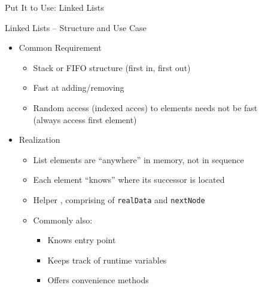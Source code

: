 \begin{frame}[fragile]{Put It to Use: Linked Lists}
\begin{tcolorbox}[title=Visualization: Inserting into an Array]
\end{tcolorbox}
%
\end{frame}


\begin{frame}[fragile]{Linked Lists -- Structure and Use Case}
%
\begin{itemize}
\item Common Requirement
	\begin{itemize}
	\item Stack or FIFO structure (first in, first out)
	\item Fast at adding/removing
	\item Random access (\ie indexed acces) to elements needs not be fast\\
		(always access first element)
	\end{itemize}
\item Realization
	\begin{itemize}
	\item List elements are \enquote{anywhere} in memory, \ie not in sequence
	\item Each element \enquote{knows} where its successor is located
	\item Helper , comprising of \texttt{realData} and \texttt{nextNode}
	\item Commonly also: 
		\begin{itemize}
		\item Knows entry point
		\item Keeps track of runtime variables
		\item Offers convenience methods
		\end{itemize}
	\end{itemize}
\end{itemize}
%
\end{frame}

